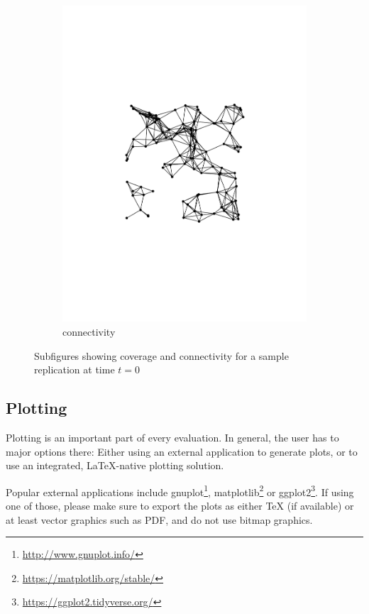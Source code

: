 \begin{figure}
\begin{subfigure}{0.3\textwidth}
      \includegraphics[width=\textwidth]{figures/connectivity-50-0-static1}
      \caption{connectivity}\label{fig:setup2}
    \end{subfigure}
	\caption{Subfigures showing coverage and connectivity for a sample replication at time $t=0$}%
	\label{fig:setups12}%
\end{figure}

\subsection{Plotting}

Plotting is an important part of every evaluation.
In general, the user has to major options there: Either using an external application to generate plots, or to use an integrated, \LaTeX{}-native plotting solution.


Popular external applications include gnuplot\footnote{\url{http://www.gnuplot.info/}}, matplotlib\footnote{\url{https://matplotlib.org/stable/}} or ggplot2\footnote{\url{https://ggplot2.tidyverse.org/}}.
If using one of those, please make sure to export the plots as either \TeX{} (if available) or at least vector graphics such as PDF, and do not use bitmap graphics.

